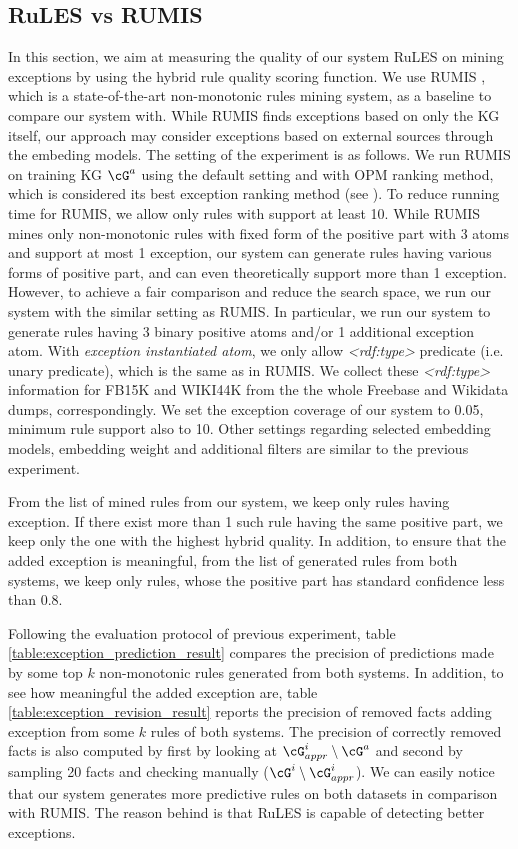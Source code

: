 \subsection{RuLES vs RUMIS}
In this section, we aim at measuring the quality of our system RuLES on mining exceptions by using the hybrid rule quality scoring function. We use RUMIS \cite{}, which is a state-of-the-art non-monotonic rules mining system, as a baseline to compare our system with. While RUMIS finds exceptions based on only the KG itself, our approach may consider exceptions based on external sources through the embeding models. The setting of the experiment is as follows. We run RUMIS on training KG $\cG^a$ using the default setting and with OPM ranking method, which is considered its best exception ranking method (see \cite{trantowards}). To reduce running time for RUMIS, we allow only rules with support at least 10. While RUMIS mines only non-monotonic rules with fixed form of the positive part with 3 atoms and support at most 1 exception, our system can generate rules having various forms of positive part, and can even theoretically support more than 1 exception. However, to achieve a fair comparison and reduce the search space, we run our system with the similar setting as RUMIS. In particular, we run our system to generate rules having 3 binary positive atoms and/or 1 additional exception atom. With \textit{exception instantiated atom}, we only allow \textit{\textless rdf:type\textgreater} predicate (i.e. unary predicate), which is the same as in RUMIS. We collect these \textit{\textless rdf:type\textgreater} information for FB15K and WIKI44K from the the whole Freebase and Wikidata dumps, correspondingly. We set the exception coverage of our system to 0.05, minimum rule support also to 10. Other settings regarding selected embedding models, embedding weight and additional filters are similar to the previous experiment. 

From the list of mined rules from our system, we keep only rules having exception. If there exist more than 1 such rule having the same positive part, we keep only the one with the highest hybrid quality. In addition, to ensure that the added exception is meaningful, from the list of generated rules from both systems, we keep only rules, whose the positive part has standard confidence less than 0.8.

Following the evaluation protocol of previous experiment, table \ref{table:exception_prediction_result} compares the precision of predictions made by some top $k$ non-monotonic rules generated from both systems. In addition, to see how meaningful the added exception are, table \ref{table:exception_revision_result} reports the precision of removed facts adding exception from some $k$ rules of both systems. The precision of correctly removed facts is also computed by first by looking at $\cG^i_{appr} \setminus \cG^a$ and second by sampling 20 facts and checking manually ($\cG^i \setminus \cG^i_{appr}$). We can easily notice that our system generates more predictive rules on both datasets in comparison with RUMIS. The reason behind is that RuLES is capable of detecting better exceptions.



